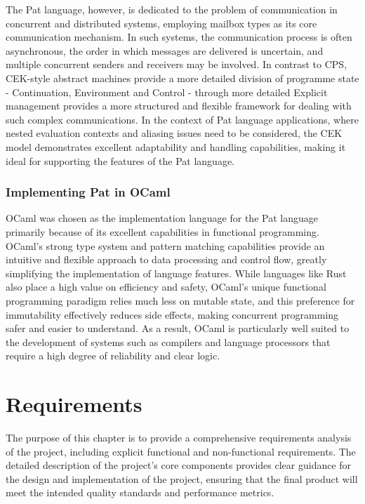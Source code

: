 \documentclass{l4proj}
\begin{document}
The Pat language, however, is dedicated to the problem of communication in concurrent and distributed systems, employing mailbox types as its core communication mechanism. In such systems, the communication process is often asynchronous, the order in which messages are delivered is uncertain, and multiple concurrent senders and receivers may be involved. In contrast to CPS, CEK-style abstract machines provide a more detailed division of programme state - Continuation, Environment and Control - through more detailed Explicit management provides a more structured and flexible framework for dealing with such complex communications. In the context of Pat language applications, where nested evaluation contexts and aliasing issues need to be considered, the CEK model demonstrates excellent adaptability and handling capabilities, making it ideal for supporting the features of the Pat language.

\subsection{Implementing Pat in OCaml}
OCaml was chosen as the implementation language for the Pat language primarily because of its excellent capabilities in functional programming. OCaml's strong type system and pattern matching capabilities provide an intuitive and flexible approach to data processing and control flow, greatly simplifying the implementation of language features. While languages like Rust also place a high value on efficiency and safety, OCaml's unique functional programming paradigm relies much less on mutable state, and this preference for immutability effectively reduces side effects, making concurrent programming safer and easier to understand. As a result, OCaml is particularly well suited to the development of systems such as compilers and language processors that require a high degree of reliability and clear logic.


\chapter{Requirements}

The purpose of this chapter is to provide a comprehensive requirements analysis of the project, including explicit functional and non-functional requirements. The detailed description of the project's core components provides clear guidance for the design and implementation of the project, ensuring that the final product will meet the intended quality standards and performance metrics.
\end{document}
